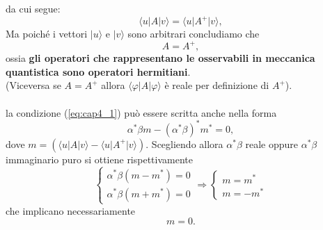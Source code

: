 \documentclass[a4paper,12pt,oneside]{book}
\begin{document}
da cui segue:
\begin{equation}
\langle u \vert A \vert v \rangle = \langle u \vert A^{+} \vert v \rangle ,
\end{equation}
Ma poiché i vettori $\vert u \rangle$ e $\vert v \rangle$ sono arbitrari concludiamo che
\begin{equation}
A= A^{+},
\end{equation}
ossia \textbf{gli operatori che rappresentano le osservabili in meccanica quantistica sono operatori hermitiani}.\\
(Viceversa se $A= A^{+}$ allora $\langle \varphi \vert A \vert \varphi \rangle$ è reale per definizione di $A^{+}$).\\ \\
la condizione (\ref{eq:cap4_1}) può essere scritta anche nella forma
\begin{equation}
\alpha ^* \beta m - \left( \alpha ^*  \beta \right) ^* m^* =0, 
\end{equation}
dove $m= \left( \langle u \vert A \vert v \rangle - \langle u \vert A^{+} \vert v \rangle \right)$. Scegliendo allora $\alpha ^* \beta$ reale oppure $\alpha ^* \beta$ immaginario puro si ottiene rispettivamente
\begin{equation}
\begin{cases}
\alpha ^* \beta \left( m- m^* \right) =0 \\
\alpha ^* \beta \left( m + m^* \right) =0
\end{cases}
\Rightarrow
\begin{cases}
m= m^*\\
m= - m^*
\end{cases}
\end{equation}
che implicano necessariamente
\begin{equation}
m=0.
\end{equation}
\end{document}
